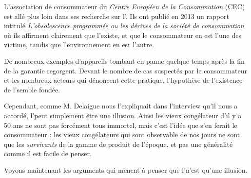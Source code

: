 L'association de consommateur du \textit{Centre Européen de la Consommation} (CEC) est allé plus loin dans ses recherche sur l'\op. Ils ont publié en 2013 un rapport\cite{cec-zevRapportObsProg}  intitulé \textit{L'obsolescence programmée ou les dérives de la société de consommation} où ils affirment clairement que l'\op existe, et que le consommateur en est l'une des victime, tandis que l'environnement en est l'autre. 

\medbreak

De nombreux exemples d'appareils tombant en panne quelque temps après la fin de la garantie regorgent. Devant le nombre de cas suspectés par le consommateur et les nombreux acteurs qui dénoncent cette pratique, l'hypothèse de l'existence de l'\op semble fondée. 

\bigbreak
Cependant, comme M. Delaigue nous l'expliquait dans l'interview qu'il nous a accordé, l'\op peut simplement être une illusion. Ainsi les vieux congélateur d'il y a 50 ans ne sont pas forcément tous immortel, mais c'est l'idée que s'en ferait le consommateur : les vieux congélateurs qui sont observable de nos jours ne sont que les \textit{survivants } de la gamme de produit de l'époque, et pas une généralité comme il est facile de penser. 


Voyons maintenant les arguments qui mènent à penser que l'\op n'est qu'une illusion. 
